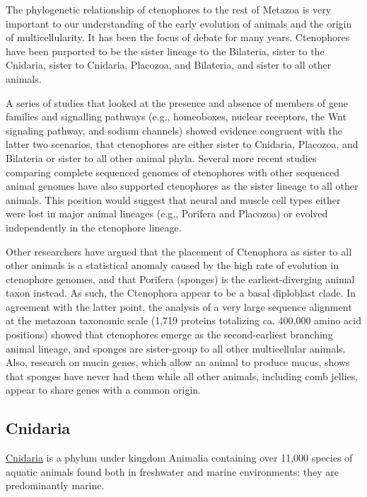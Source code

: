 The phylogenetic relationship of ctenophores to the rest of Metazoa is very important to our understanding of the early evolution of animals and the origin of multicellularity. It has been the focus of debate for many years. Ctenophores have been purported to be the sister lineage to the Bilateria, sister to the Cnidaria, sister to Cnidaria, Placozoa, and Bilateria, and sister to all other animals.

A series of studies that looked at the presence and absence of members of gene families and signalling pathways (e.g., homeoboxes, nuclear receptors, the Wnt signaling pathway, and sodium channels) showed evidence congruent with the latter two scenarios, that ctenophores are either sister to Cnidaria, Placozoa, and Bilateria or sister to all other animal phyla. Several more recent studies comparing complete sequenced genomes of ctenophores with other sequenced animal genomes have also supported ctenophores as the sister lineage to all other animals. This position would suggest that neural and muscle cell types either were lost in major animal lineages (e.g., Porifera and Placozoa) or evolved independently in the ctenophore lineage.

Other researchers have argued that the placement of Ctenophora as sister to all other animals is a statistical anomaly caused by the high rate of evolution in ctenophore genomes, and that Porifera (sponges) is the earliest-diverging animal taxon instead. As such, the Ctenophora appear to be a basal diploblast clade. In agreement with the latter point, the analysis of a very large sequence alignment at the metazoan taxonomic scale (1,719 proteins totalizing ca. 400,000 amino acid positions) showed that ctenophores emerge as the second-earliest branching animal lineage, and sponges are sister-group to all other multicellular animals. Also, research on mucin genes, which allow an animal to produce mucus, shows that sponges have never had them while all other animals, including comb jellies, appear to share genes with a common origin.

\hypertarget{cnidaria}{%
\subsection{Cnidaria}\label{cnidaria}}

\href{https://en.wikipedia.org/wiki/Cnidaria}{Cnidaria} is a phylum under kingdom Animalia containing over 11,000 species of aquatic animals found both in freshwater and marine environments: they are predominantly marine.

